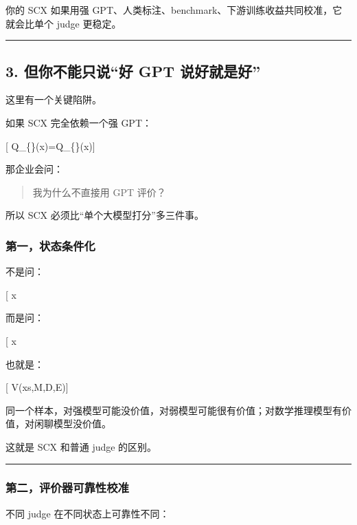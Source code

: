 \documentclass[
  12pt,
]{ctexart}
\begin{document}
你的 SCX 如果用强
GPT、人类标注、benchmark、下游训练收益共同校准，它就会比单个 judge
更稳定。

\begin{center}\rule{0.5\linewidth}{0.5pt}\end{center}

\subsection{3. 但你不能只说``好 GPT
说好就是好''}\label{ux4f46ux4f60ux4e0dux80fdux53eaux8bf4ux597d-gpt-ux8bf4ux597dux5c31ux662fux597d}

这里有一个关键陷阱。

如果 SCX 完全依赖一个强 GPT：

{[} Q\_\{\}(x)=Q\_\{\}(x){]}

那企业会问：

\begin{quote}
我为什么不直接用 GPT 评价？
\end{quote}

所以 SCX 必须比``单个大模型打分''多三件事。

\subsubsection{第一，状态条件化}\label{ux7b2cux4e00ux72b6ux6001ux6761ux4ef6ux5316}

不是问：

{[} x \text{ 好不好}{]}

而是问：

{[} x \text{ 在哪个状态里好？对哪个模型有价值？由哪个专家评价可靠？}{]}

也就是：

{[} V(x\mid s,\mathcal M,\mathcal D,\mathcal E){]}

同一个样本，对强模型可能没价值，对弱模型可能很有价值；对数学推理模型有价值，对闲聊模型没价值。

这就是 SCX 和普通 judge 的区别。

\begin{center}\rule{0.5\linewidth}{0.5pt}\end{center}

\subsubsection{第二，评价器可靠性校准}\label{ux7b2cux4e8cux8bc4ux4ef7ux5668ux53efux9760ux6027ux6821ux51c6}

不同 judge 在不同状态上可靠性不同：
\end{document}
